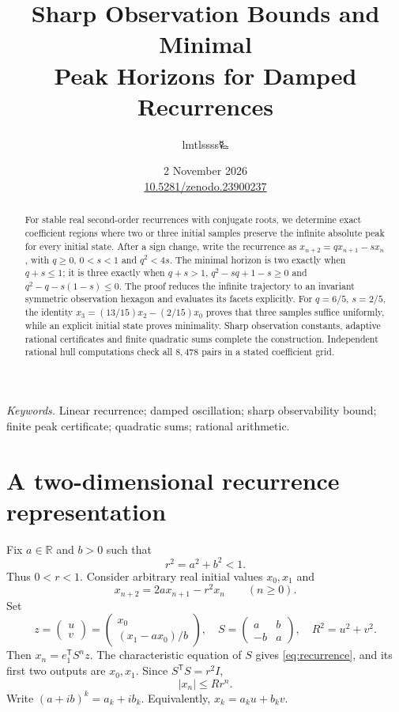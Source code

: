 \documentclass[11pt,a4paper]{article}
\title{\LARGE Sharp Observation Bounds and Minimal\\Peak Horizons for Damped Recurrences}
\author{lmtlssss{\authorsymbol 🜐}}
\date{2 November 2026\\[3pt]\small\href{https://doi.org/10.5281/zenodo.23900237}{10.5281/zenodo.23900237}}
\newcommand{\R}{\mathbb R}\newcommand{\C}{\mathbb C}\newcommand{\Z}{\mathbb Z}\newcommand{\N}{\mathbb N}\newcommand{\ip}[2]{\langle #1,#2\rangle}\newcommand{\norm}[1]{\lVert #1\rVert}\newcommand{\one}{\mathbf 1}
\begin{document}
\maketitle\thispagestyle{plain}

\begin{abstract}
For stable real second-order recurrences with conjugate roots, we determine
exact coefficient regions where two or three initial samples preserve the
infinite absolute peak for every initial state. After a sign change, write
the recurrence as $x_{n+2}=q x_{n+1}-s x_n$, with $q\ge0$, $0<s<1$ and
$q^2<4s$. The minimal horizon is two exactly when $q+s\le1$; it is three
exactly when $q+s>1$, $q^2-sq+1-s\ge0$ and
$q^2-q-s(1-s)\le0$. The proof reduces the infinite trajectory to an
invariant symmetric observation hexagon and evaluates its facets explicitly.
For $q=6/5$, $s=2/5$, the identity
$x_3=(13/15)x_2-(2/15)x_0$ proves that three samples suffice uniformly,
while an explicit initial state proves minimality.
Sharp observation constants, adaptive rational certificates and finite
quadratic sums complete the construction. Independent rational hull
computations check all $8,478$ pairs in a stated coefficient grid.
\end{abstract}
\noindent\textit{Keywords.} Linear recurrence; damped oscillation; sharp
observability bound; finite peak certificate; quadratic sums; rational arithmetic.

\section{A two-dimensional recurrence representation}
Fix $a\in\R$ and $b>0$ such that
\begin{equation}\label{eq:stable}
 r^2=a^2+b^2<1.
\end{equation}
Thus $0<r<1$. Consider arbitrary real initial values $x_0,x_1$ and
\begin{equation}\label{eq:recurrence}
 x_{n+2}=2a x_{n+1}-r^2x_n\qquad(n\ge0).
\end{equation}
Set
\begin{equation}\label{eq:state}
 z=\begin{pmatrix}u\\v\end{pmatrix}
 =\begin{pmatrix}x_0\\(x_1-a x_0)/b\end{pmatrix},\quad
 S=\begin{pmatrix}a&b\\-b&a\end{pmatrix},\quad
 R^2=u^2+v^2.
\end{equation}
Then $x_n=e_1^\mathsf TS^n z$. The characteristic equation of $S$ gives
\eqref{eq:recurrence}, and its first two outputs are $x_0,x_1$.
Since $S^\mathsf TS=r^2I$,
\begin{equation}\label{eq:envelope}
 |x_n|\le Rr^n.
\end{equation}
Write $(a+ib)^k=a_k+ib_k$. Equivalently,
$x_k=a_ku+b_kv$.
\end{document}
